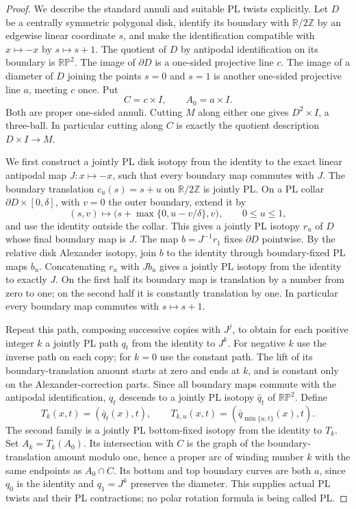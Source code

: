 \begin{proof}
We describe the standard annuli and suitable PL twists explicitly.
Let $D$ be a centrally symmetric polygonal disk, identify its
boundary with $\mathbb R/2\mathbb Z$ by an edgewise linear
coordinate $s$, and make the identification compatible with
$x\mapsto-x$ by $s\mapsto s+1$. The quotient of $D$ by antipodal
identification on its boundary is $\mathbb {RP}^2$.
The image of $\partial D$ is a one-sided projective line $c$.
The image of a diameter of $D$ joining the points $s=0$ and $s=1$
is another one-sided projective line $a$, meeting $c$ once. Put
\[
 C=c\times I,\qquad A_0=a\times I.
\]
Both are proper one-sided annuli. Cutting $M$ along either one
gives $D^2\times I$, a three-ball. In particular cutting along $C$
is exactly the quotient description $D\times I\to M$.

We first construct a jointly PL disk isotopy from the identity to
the exact linear antipodal map $J:x\mapsto-x$, such that every
boundary map commutes with $J$. The boundary translation
$c_u(s)=s+u$ on $\mathbb R/2\mathbb Z$ is jointly PL. On a PL
collar $\partial D\times[0,\delta]$, with $v=0$ the outer boundary,
extend it by
\[
 (s,v)\longmapsto
 \bigl(s+\max\{0,u-v/\delta\},v\bigr),
 \qquad 0\leq u\leq1,
\]
and use the identity outside the collar. This gives a jointly PL
isotopy $r_u$ of $D$ whose final boundary map is $J$. The map
$b=J^{-1}r_1$ fixes $\partial D$ pointwise. By the relative disk
Alexander isotopy, join $b$ to the identity through
boundary-fixed PL maps $b_u$. Concatenating $r_u$ with $Jb_u$
gives a jointly PL isotopy from the identity to exactly $J$.
On the first half its boundary map is translation by a number from
zero to one; on the second half it is constantly translation by
one. In particular every boundary map commutes with $s\mapsto s+1$.

Repeat this path, composing successive copies with $J^j$, to obtain
for each positive integer $k$ a jointly PL path $q_t$ from the
identity to $J^k$. For negative $k$ use the inverse path on each
copy; for $k=0$ use the constant path. The lift of its boundary-translation amount starts at zero
and ends at $k$, and is constant only on the Alexander-correction
parts. Since all boundary maps commute with the antipodal
identification, $q_t$ descends to a jointly PL isotopy $\bar q_t$
of $\mathbb {RP}^2$. Define
\[
 T_k(x,t)=(\bar q_t(x),t),\qquad
 T_{k,u}(x,t)=(\bar q_{\min\{u,t\}}(x),t).             \tag{A.127.1}
\]
The second family is a jointly PL bottom-fixed isotopy from the
identity to $T_k$. Set $A_k=T_k(A_0)$. Its intersection with $C$
is the graph of the boundary-translation amount modulo one, hence
a proper arc of winding number $k$ with the same endpoints as
$A_0\cap C$. Its bottom and top boundary curves are both $a$,
since $q_0$ is the identity and $q_1=J^k$ preserves the diameter.
This supplies actual PL twists and their PL contractions; no polar
rotation formula is being called PL.


\end{proof}
